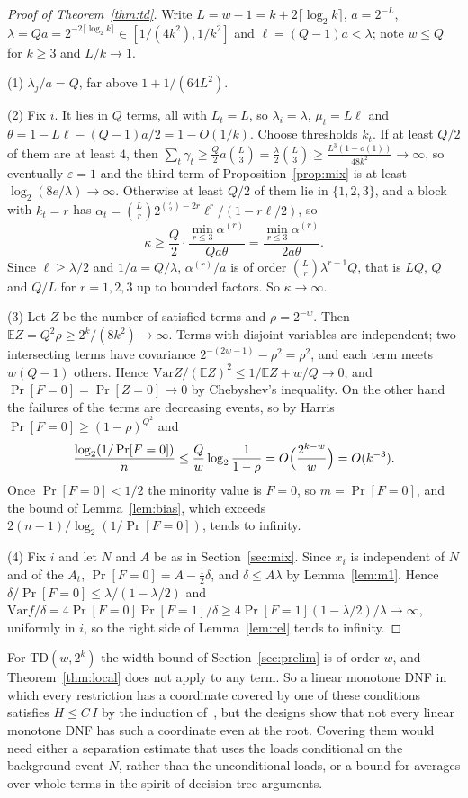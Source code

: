 \documentclass[11pt]{amsart}
\theoremstyle{remark}
\newcommand{\Var}{\mathrm{Var}}
\newcommand{\E}{\mathbb{E}}
\begin{document}
\begin{proof}[Proof of Theorem~\ref{thm:td}]
Write $L=w-1=k+2\lceil\log_2k\rceil$, $a=2^{-L}$, $\lambda=Qa=2^{-2\lceil\log_2k\rceil}\in[1/(4k^2),1/k^2]$ and
$\ell=(Q-1)a<\lambda$; note $w\le Q$ for $k\ge3$ and $L/k\to1$.

(1) $\lambda_j/a=Q$, far above $1+1/(64L^2)$.

(2) Fix $i$. It lies in $Q$ terms, all with $L_t=L$, so $\lambda_i=\lambda$, $\mu_t=L\ell$ and
$\theta=1-L\ell-(Q-1)a/2=1-O(1/k)$. Choose thresholds $k_t$. If at least $Q/2$ of them are at least $4$, then
$\sum_t\gamma_t\ge\frac Q2a\binom L3=\frac\lambda2\binom L3\ge\frac{L^3(1-o(1))}{48k^2}\to\infty$, so eventually
$\varepsilon=1$ and the third term of Proposition~\ref{prop:mix} is at least $\log_2(8e/\lambda)\to\infty$.
Otherwise at least $Q/2$ of them lie in $\{1,2,3\}$, and a block with $k_t=r$ has
$\alpha_t=\binom Lr2^{\binom r2-2r}\ell^r/(1-r\ell/2)$, so
\[
\kappa\ge\frac{Q}{2}\cdot\frac{\min_{r\le3}\alpha^{(r)}}{Qa\theta}=\frac{\min_{r\le3}\alpha^{(r)}}{2a\theta}.
\]
Since $\ell\ge\lambda/2$ and $1/a=Q/\lambda$, $\alpha^{(r)}/a$ is of order $\binom Lr\lambda^{r-1}Q$, that is $LQ$,
$Q$ and $Q/L$ for $r=1,2,3$ up to bounded factors. So $\kappa\to\infty$.

(3) Let $Z$ be the number of satisfied terms and $\rho=2^{-w}$. Then $\E Z=Q^2\rho\ge2^k/(8k^2)\to\infty$. Terms with
disjoint variables are independent; two intersecting terms have covariance $2^{-(2w-1)}-\rho^2=\rho^2$, and each term meets
$w(Q-1)$ others. Hence $\Var Z/(\E Z)^2\le1/\E Z+w/Q\to0$, and $\Pr[F=0]=\Pr[Z=0]\to0$ by Chebyshev's inequality. On
the other hand the failures of the terms are decreasing events, so by Harris $\Pr[F=0]\ge(1-\rho)^{Q^2}$ and
\[
\frac{\log_2(1/\Pr[F=0])}{n}\le\frac Qw\log_2\frac1{1-\rho}=O\Bigl(\frac{2^{k-w}}w\Bigr)=O(k^{-3}).
\]
Once $\Pr[F=0]<1/2$ the minority value is $F=0$, so $m=\Pr[F=0]$, and the bound of Lemma~\ref{lem:bias}, which
exceeds $2(n-1)/\log_2(1/\Pr[F=0])$, tends to infinity.

(4) Fix $i$ and let $N$ and $A$ be as in Section~\ref{sec:mix}. Since $x_i$ is independent of $N$ and of the $A_t$,
$\Pr[F=0]=A-\frac12\delta$, and $\delta\le A\lambda$ by Lemma~\ref{lem:m1}. Hence $\delta/\Pr[F=0]\le\lambda/(1-\lambda/2)$
and $\Var f/\delta=4\Pr[F=0]\Pr[F=1]/\delta\ge4\Pr[F=1](1-\lambda/2)/\lambda\to\infty$, uniformly in $i$, so the right
side of Lemma~\ref{lem:rel} tends to infinity.
\end{proof}

For $\mathrm{TD}(w,2^k)$ the width bound of Section~\ref{sec:prelim} is of order $w$, and Theorem~\ref{thm:local} does
not apply to any term. So a linear monotone DNF in which every restriction has a coordinate covered by one of these
conditions satisfies $H\le C\,I$ by the induction of~\cite{Shm1}, but the designs show that not every linear monotone DNF
has such a coordinate even at the root. Covering them would need either a separation estimate that uses the loads
conditional on the background event $N$, rather than the unconditional loads, or a bound for averages over whole terms
in the spirit of decision-tree arguments.
\end{document}
